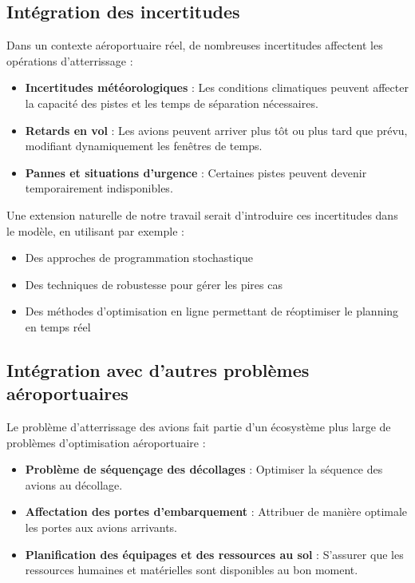 \documentclass[a4paper,12pt]{report}
\begin{document}
\subsection{Intégration des incertitudes}
Dans un contexte aéroportuaire réel, de nombreuses incertitudes affectent les opérations d'atterrissage :

\begin{itemize}
  \item \textbf{Incertitudes météorologiques} : Les conditions climatiques peuvent affecter la capacité des pistes et les temps de séparation nécessaires.
  \item \textbf{Retards en vol} : Les avions peuvent arriver plus tôt ou plus tard que prévu, modifiant dynamiquement les fenêtres de temps.
  \item \textbf{Pannes et situations d'urgence} : Certaines pistes peuvent devenir temporairement indisponibles.
\end{itemize}

Une extension naturelle de notre travail serait d'introduire ces incertitudes dans le modèle, en utilisant par exemple :
\begin{itemize}
  \item Des approches de programmation stochastique
  \item Des techniques de robustesse pour gérer les pires cas
  \item Des méthodes d'optimisation en ligne permettant de réoptimiser le planning en temps réel
\end{itemize}

\subsection{Intégration avec d'autres problèmes aéroportuaires}
Le problème d'atterrissage des avions fait partie d'un écosystème plus large de problèmes d'optimisation aéroportuaire :

\begin{itemize}
  \item \textbf{Problème de séquençage des décollages} : Optimiser la séquence des avions au décollage.
  \item \textbf{Affectation des portes d'embarquement} : Attribuer de manière optimale les portes aux avions arrivants.
  \item \textbf{Planification des équipages et des ressources au sol} : S'assurer que les ressources humaines et matérielles sont disponibles au bon moment.
\end{itemize}
\end{document}
